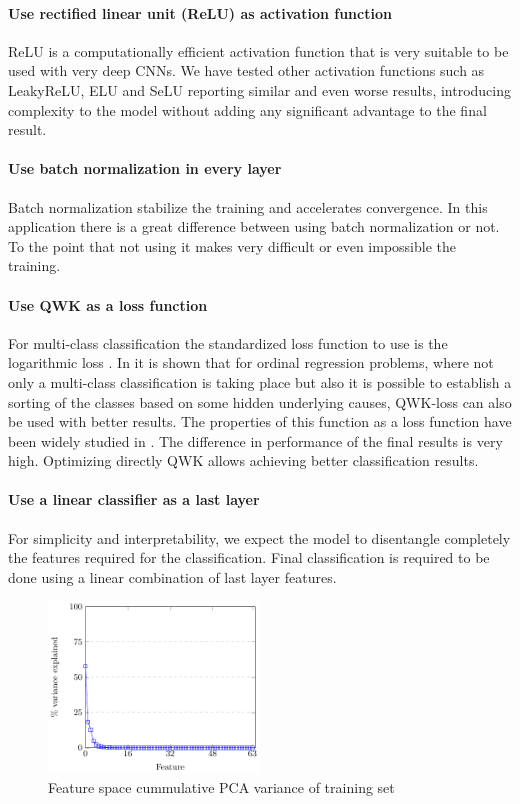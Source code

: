 \paragraph{Use rectified linear unit (ReLU) as activation function} ReLU is a computationally efficient activation function that is very suitable to be used with very deep CNNs\citep{Dahl2013}. We have tested other activation functions such as LeakyReLU, ELU and SeLU reporting similar and even worse results, introducing complexity to the model without adding any significant advantage to the final result.

\paragraph{Use batch normalization in every layer} Batch normalization \citep{batch-norm} stabilize the training and accelerates convergence. In this application there is a great difference between using batch normalization or not. To the point that not using it makes very difficult or even impossible the training.

\paragraph{Use QWK as a loss function} For multi-class classification the standardized loss function to use is the logarithmic loss \citep{Goodfellow-et-al-2016}. In \citep{delatorre2017} it is shown that for ordinal regression problems, where not only a multi-class classification is taking place but also it is possible to establish a sorting of the classes based on some hidden underlying causes, QWK-loss can also be used with better results. The properties of this function as a loss function have been widely studied in \citep{delatorre2017}. The difference in performance of the final results is very high. Optimizing directly QWK allows achieving better classification results.

\paragraph{Use a linear classifier as a last layer} For simplicity and interpretability, we expect the model to disentangle completely the features required for the classification. Final classification is required to be done using a linear combination of last layer features.

\begin{figure}[ht!]
	\centering
	\includegraphics[width=0.50\textwidth]{Figures/chapter_classification/figures/PCA_feature_space.pdf}
	\caption{Feature space cummulative PCA variance of training set}
	\label{class2:fig:pca_graph}
\end{figure}

